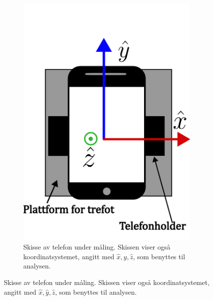 \begin{figure}[h!]
\begin{subfigure}{.47\textwidth}
    \includegraphics[width=\textwidth]{img/Plattform med telefoni.pdf}
    \caption{Skisse av telefon under måling. Skissen viser også koordinatsystemet, angitt med $\hat{x}, \hat{y}, \hat{z}$, som benyttes til analysen.}
    \label{fig:telf_akser}
\end{subfigure}
\end{figure}





